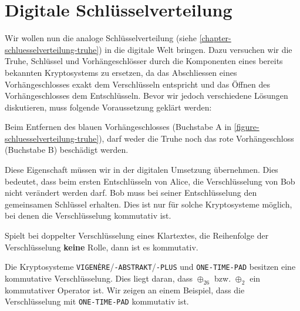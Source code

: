 
\toggletrue{image}
\toggletrue{imagehover}

\chapter{Digitale Schlüsselverteilung}
\label{chapter-digitale-schluesselverteilung}

Wir wollen nun die analoge Schlüsselverteilung (siehe \autoref{chapter-schluesselverteilung-truhe}) in die digitale Welt bringen. Dazu versuchen wir die Truhe, Schlüssel und Vorhängeschlösser durch die Komponenten eines bereits bekannten Kryptosystems zu ersetzen, da das Abschliessen eines Vorhängeschlosses exakt dem Verschlüsseln entspricht und das Öffnen des Vorhängeschlosses dem Entschlüsseln. Bevor wir jedoch verschiedene Lösungen diskutieren, muss folgende Voraussetzung geklärt werden:

\begin{important}
	\item Beim Entfernen des blauen Vorhängeschlosses (Buchstabe A in \autoref{figure-schluesselverteilung-truhe}), darf weder die Truhe noch das rote Vorhängeschloss (Buchstabe B) beschädigt werden.
\end{important}

Diese Eigenschaft müssen wir in der digitalen Umsetzung übernehmen. Dies bedeutet, dass beim ersten Entschlüsseln von Alice, die Verschlüsselung von Bob nicht verändert werden darf. Bob muss bei seiner Entschlüsselung den gemeinsamen Schlüssel erhalten. Dies ist nur für solche Kryptosysteme möglich, bei denen die Verschlüsselung kommutativ ist.

\begin{definition}
	Spielt bei doppelter Verschlüsselung eines Klartextes, die Reihenfolge der Verschlüsselung \textbf{keine} Rolle, dann ist es kommutativ.
\end{definition}

Die Kryptosysteme \texttt{VIGENÈRE}/\texttt{-ABSTRAKT}/\texttt{-PLUS} und \texttt{ONE-TIME-PAD} besitzen eine kommutative Verschlüsselung. Dies liegt daran, dass $\oplus_{26}$ bzw. $\oplus_2$ ein kommutativer Operator ist. Wir zeigen an einem Beispiel, dass die Verschlüsselung mit \texttt{ONE-TIME-PAD} kommutativ ist.

